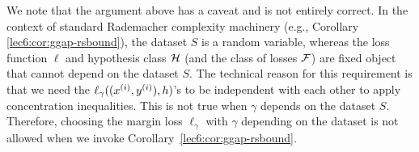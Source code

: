 	
We note that the argument above has a caveat and is not entirely correct. 
In the context of standard Rademacher complexity machinery (e.g., Corollary \ref{lec6:cor:ggap-rsbound}), the dataset $S$ is a  random variable, whereas the loss function $\ell$ and hypothesis class $\cH$ (and the class of losses $\cF$) are  fixed object that cannot depend on the dataset $S$. The technical reason for this requirement is that we need the $\ell_\gamma((x\sp{i}, y\sp{i}), h)$'s to be independent with each other to apply concentration inequalities. This is not true when $\gamma$ depends on the dataset $S$. Therefore, choosing the margin loss $\ell_\gamma$ with $\gamma$ depending on the dataset is not allowed when we invoke Corollary~\ref{lec6:cor:ggap-rsbound}. 


